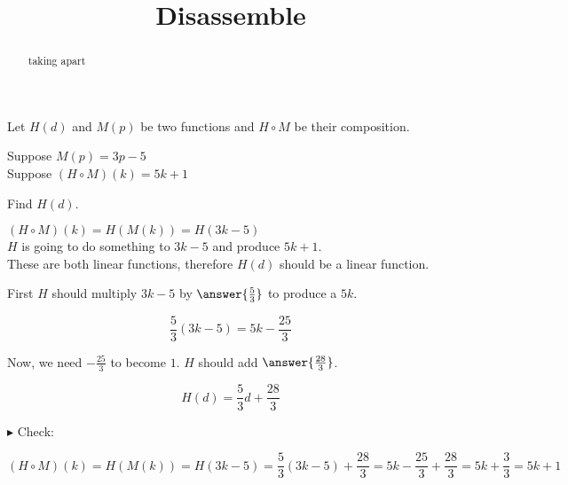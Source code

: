 \documentclass{ximera}
\title{Disassemble}
\begin{document}
\begin{abstract}
taking apart
\end{abstract}
\maketitle





\begin{example}


Let $H(d)$ and $M(p)$ be two functions and $H \circ M$ be their composition.


Suppose $M(p) = 3 p - 5$ \\

Suppose $(H \circ M)(k) = 5 k + 1$


Find $H(d)$.



\begin{explanation}




$(H \circ M)(k) = H(M(k)) = H(3 k - 5)$  \\



$H$ is going to do something to $3 k - 5$ and produce $5 k + 1$. \\




These are both linear functions, therefore $H(d)$ should be a linear function.


First $H$ should multiply $3 k - 5$ by $\answer{\frac{5}{3}}$ to produce a $5k$.


\[    \frac{5}{3} (3 k - 5) = 5k - \frac{25}{3}   \]



Now, we need $-\frac{25}{3}$ to become $1$.  $H$ should add $\answer{\frac{28}{3}}$.

\[  H(d) =    \frac{5}{3} d +     \frac{28}{3} \]



$\blacktriangleright$ Check: 


\[    (H \circ M)(k) = H(M(k)) = H(3 k - 5) =    \frac{5}{3} (3 k - 5) +     \frac{28}{3}  = 5k - \frac{25}{3}  + \frac{28}{3}  = 5k + \frac{3}{3}  = 5k + 1\]





\end{explanation}

\end{example}
\end{document}
